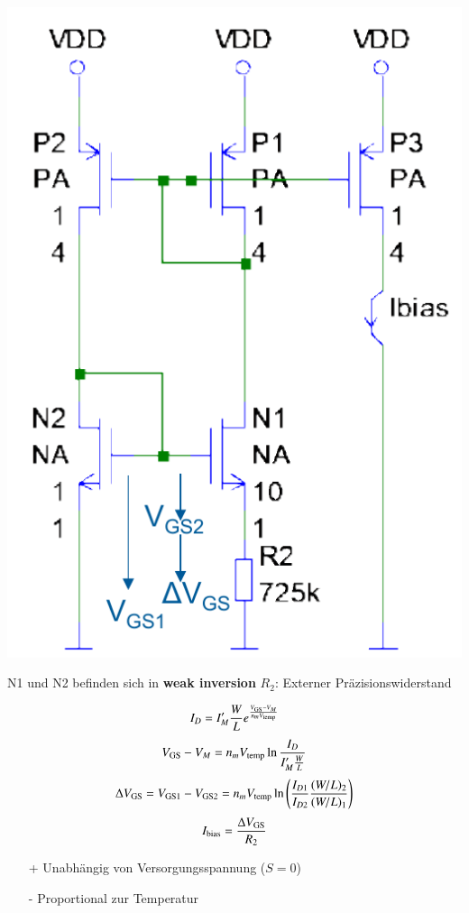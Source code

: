 \begin{minipage}[t]{0.38\columnwidth}
    \includegraphics[width=\columnwidth, align=t]{images/13_bootstrap_referenz.pdf}
\end{minipage}
\hfill
\begin{minipage}[t]{0.58\columnwidth}
    \begin{outline}
        \1 N1 und N2 befinden sich in \textbf{weak inversion}
        \1 $R_2$: Externer Präzisionswiderstand
    \end{outline}

    \smallskip

    \[
        I_D = I_M' \frac{W}{L} e^{\frac{V_{\rm GS}-V_M}{n_m V_\mathrm{temp}}}
    \]
    \[
        V_{\rm GS} - V_M = n_m V_\mathrm{temp} \ln{\frac{I_D}{I_M' \frac{W}{L}}}
    \]
    \[
        \Delta V_{\rm GS} = V_{\rm GS1} - V_{\rm GS2} = n_m V_\mathrm{temp} \ln\left(\frac{I_{D1}}{I_{D2}} \frac{(W/L)_2}{(W/L)_1}\right)
    \]
    \[
        I_\mathrm{bias} = \frac{\Delta V_{\rm GS}}{R_2}
    \]

    \begin{itemize}
        \item[+] Unabhängig von Versorgungsspannung ($S=0$)
        \item[-] Proportional zur Temperatur 
    \end{itemize}
\end{minipage}


